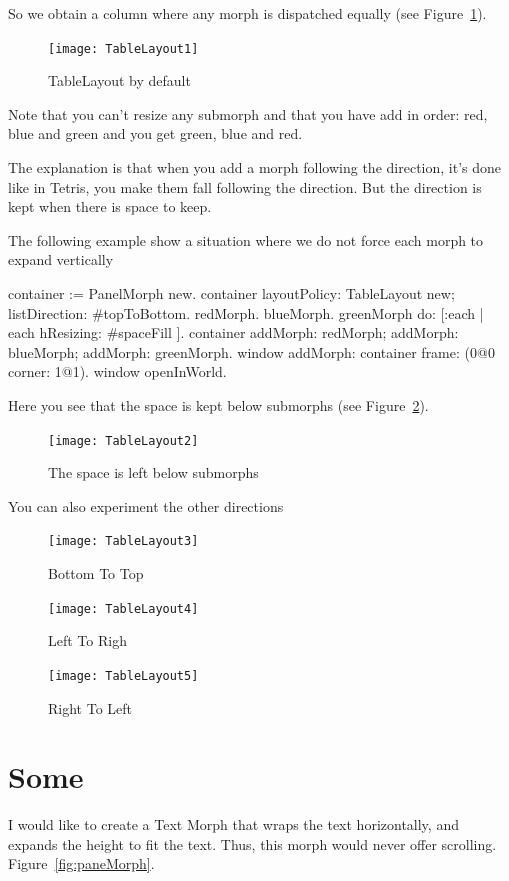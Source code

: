 \documentclass[a4paper,10pt,twoside]{book}
\begin{document}
So we obtain a column where any morph is dispatched equally (see Figure~\ref{fig:tableLayout1}).

\begin{figure}[ht]\centering
	\texttt{[image: TableLayout1]}
	\caption{TableLayout by default}
	\label{fig:tableLayout1}
\end{figure}

Note that you can't resize any submorph and that you have add in order:
red, blue and green and you get 
green, blue and  red.

The explanation is that when you add a morph following the direction, it's done like in Tetris, you make them fall following the direction. But the direction is kept when there is space to keep.


The following example show a situation  where we do not force each morph to expand vertically
\begin{code}{}
container := PanelMorph new.
container 
	layoutPolicy: TableLayout new;
	listDirection: #topToBottom.
{ redMorph. blueMorph. greenMorph } do: [:each |
	each hResizing: #spaceFill ].
container 
	addMorph: redMorph;
	addMorph: blueMorph;
	addMorph: greenMorph.
window
	addMorph: container
	frame: (0@0 corner: 1@1).
window openInWorld.
\end{code}

Here you see that the space is kept below submorphs (see Figure~\ref{fig:tableLayout2}).

\begin{figure}[ht]\centering
	\texttt{[image: TableLayout2]}
	\caption{The space is left below submorphs}
	\label{fig:tableLayout2}
\end{figure}

You can also experiment the other directions

\begin{figure}[ht]\centering
	\texttt{[image: TableLayout3]}
	\caption{Bottom To Top}
	\label{fig:tableLayout3}
	\texttt{[image: TableLayout4]}
	\caption{Left To Righ}
	\label{fig:tableLayout4}
	\texttt{[image: TableLayout5]}
	\caption{Right To Left}
	\label{fig:tableLayout5}
\end{figure}




\section{Some}


I would like to create a Text Morph that wraps the text horizontally, and expands the height to fit the text. Thus, this morph would never offer scrolling. Figure~\ref{fig:paneMorph}.
\end{document}
